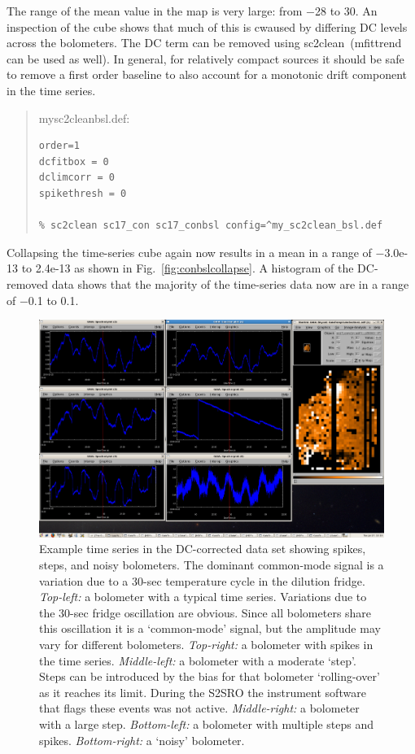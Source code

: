 \documentclass[twoside,11pt]{article}
\newcommand{\xref}[3]{#1}
\renewcommand{\_}{\texttt{\symbol{95}}}
\newenvironment{myquote}{\begin{quote}\begin{small}}{\end{small}\end{quote}}
\newcommand{\task}[1]{\textsf{#1}}
\newcommand{\clean}{\xref{\task{sc2clean}}{sun258}{SC2CLEAN}}
\begin{document}
The range of the mean value in the map is very large: from $-$28 to
30. An inspection of the cube shows that much of this is cwaused by 
differing DC levels across the bolometers. The DC term can be removed
using \clean\  (mfittrend can be used as well). In general, for
relatively compact sources it should be safe to remove a first order
baseline to also account for a monotonic drift component in the time
series.

\begin{myquote}
my\_sc2clean\_bsl.def:
\begin{verbatim}
order=1
dcfitbox = 0
dclimcorr = 0
spikethresh = 0

% sc2clean sc17_con sc17_conbsl config=^my_sc2clean_bsl.def
\end{verbatim}
\end{myquote}


Collapsing the time-series cube again now results in a mean in a range
of $-$3.0e-13 to 2.4e-13 as shown in Fig.~\ref{fig:conbslcollapse}. A
histogram of the DC-removed data shows that the majority of the
time-series data now are in a range of $-$0.1 to 0.1.

\begin{figure}
\begin{center}
\includegraphics[width=1.0\linewidth]{sc19_timeseries}
\caption{Example time series in the DC-corrected data set showing
spikes, steps, and noisy bolometers. The dominant common-mode signal is
a variation due to a 30-sec temperature cycle in the dilution fridge.
{\sl Top-left:} a bolometer with a typical time
series. Variations due to the 30-sec fridge oscillation are
obvious. Since all bolometers share this oscillation it is a
`common-mode' signal, but the amplitude may vary for different
bolometers.
{\sl Top-right:} a bolometer with spikes in the time
series. {\sl Middle-left:} a bolometer with a moderate `step'. Steps
can be introduced by the bias for that bolometer `rolling-over' as it
reaches its limit. During the S2SRO the instrument software that flags
these events was not active.
{\sl Middle-right:} a bolometer with a large step.
{\sl Bottom-left:} a bolometer with multiple steps and
spikes.
{\sl Bottom-right:} a `noisy' bolometer. }
\label{fig:timeseries}
\end{center}
\end{figure}
\end{document}
